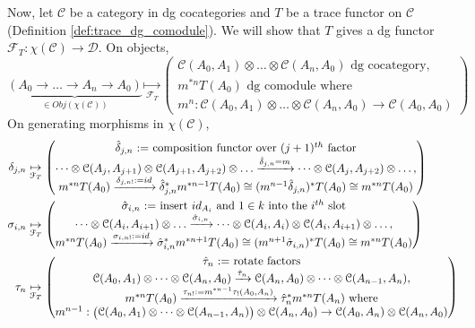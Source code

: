 Now, let $\mathcal{C}$ be a category in dg cocategories 
and $T$ be a trace functor on $\mathcal{C}$ 
(Definition \ref{def:trace_dg_comodule}). We will show 
that $T$ gives a dg functor $\mathcal{F}_T: 
\chi(\mathcal{C}) \to \mathcal{D}$. On objects,
$$
\underbrace{(A_0 \to \dots \to A_n \to A_0)}_{\in Obj(\chi(\mathcal{C}))}
\underset{\mathcal{F}_T}{\mapsto} 
\begin{pmatrix}
	\mathcal{C}(A_0,A_1) \otimes \dots \otimes \mathcal{C}(A_n,A_0)
	\textrm{ dg cocategory,}\\
	m^{*n} T(A_0) \textrm{ dg comodule where }\\
	m^n: \mathcal{C}(A_0,A_1) \otimes \dots \otimes \mathcal{C}(A_n,A_0) \to \mathcal{C}(A_0,A_0)
\end{pmatrix}
$$
On generating morphisms in $\chi(\mathcal{C})$, 
\begin{align} \label{eq:trace_induced_dg}
\begin{split}
\delta_{j,n}
&\underset{\mathcal{F}_T}{\mapsto} 
\begin{pmatrix}
	\textrm{$\hat{\delta}_{j,n}$ := composition functor over $(j+1)^{th}$ factor}\\
	\dots \otimes \mathcal{C}(A_j,A_{j+1})
	\otimes \mathcal{C}(A_{j+1},A_{j+2}) \otimes \dots
	\xrightarrow{\hat{\delta}_{j,n}=m}
	\dots \otimes \mathcal{C}(A_j,A_{j+2}) \otimes \dots,\\
	m^{*n}T(A_0)
	\xrightarrow{\delta_{j,n!} := id}
	\hat{\delta}_{j,n}^* m^{*n-1}T(A_0)
	\cong (m^{n-1}\hat{\delta}_{j,n})^* T(A_0)
	\cong m^{*n} T(A_0)
\end{pmatrix}\\
%
\sigma_{i,n}
&\underset{\mathcal{F}_T}{\mapsto} 
\begin{pmatrix}
	\textrm{$\hat{\sigma}_{i,n}$ := insert $id_{A_i}$ and $1\in k$ 
	into the $i^{th}$ slot}\\
	\dots \otimes \mathcal{C}(A_i,A_{i+1})
	\otimes \dots
	\xrightarrow{\hat{\sigma}_{i,n}}
	\dots \otimes \mathcal{C}(A_i,A_i) 
	\otimes \mathcal{C}(A_i,A_{i+1}) \otimes \dots,\\
	m^{*n}T(A_0)
	\xrightarrow{\sigma_{i,n!} := id}
	\hat{\sigma}_{i,n}^* m^{*n+1}T(A_0)
	\cong (m^{n+1}\hat{\sigma}_{i,n})^* T(A_0)
	\cong m^{*n} T(A_0)
\end{pmatrix}\\
%
\tau_n
&\underset{\mathcal{F}_T}{\mapsto} 
\begin{pmatrix}
	\textrm{$\hat{\tau}_n$ := rotate factors}\\
	\mathcal{C}(A_0,A_1) \otimes \dots 
	\otimes \mathcal{C}(A_n,A_0)
	\xrightarrow{\hat{\tau}_n}
	\mathcal{C}(A_n,A_0) \otimes \dots 
	\otimes \mathcal{C}(A_{n-1},A_n),\\
	m^{*n}T(A_0)
	\xrightarrow{\tau_{n!} := m^{*n-1} \tau_!(A_0,A_n)}
	\hat{\tau}_n^* m^{*n}T(A_n) \textrm{ where}\\
	m^{n-1}: 
	{\scriptsize \big( \mathcal{C}(A_0,A_1) \otimes \dots \otimes 
	\mathcal{C}(A_{n-1},A_n) \big) \otimes \mathcal{C}(A_n,A_0)
	\to \mathcal{C}(A_0,A_n) \otimes \mathcal{C}(A_n,A_0)}
\end{pmatrix}
\end{split}
\end{align}
